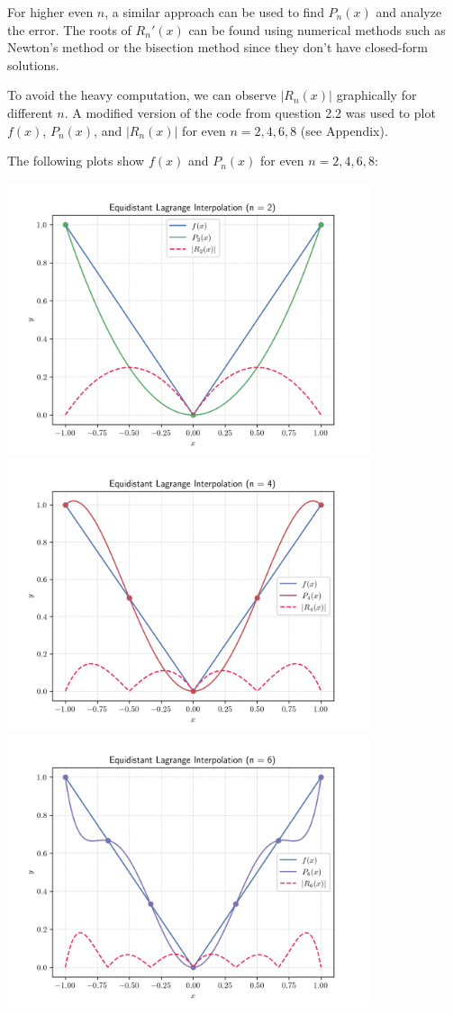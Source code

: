 \documentclass[12pt]{article}
\newcounter{question}
\begin{document}
For higher even $n$, a similar approach can be used to find $P_n(x)$ and analyze the error. The roots of $R_n'(x)$ can be found using numerical methods such as Newton's method or the bisection method since they don't have closed-form solutions.

To avoid the heavy computation, we can observe $|R_n(x)|$ graphically for different $n$. A modified version of the code from question 2.2 was used to plot $f(x)$, $P_n(x)$, and $|R_n(x)|$ for even $n=2, 4, 6, 8$ (see Appendix).

\newpage

The following plots show $f(x)$ and $P_n(x)$ for even $n=2, 4, 6, 8$:
\begin{center}
    \includegraphics[width=0.8\textwidth]{../plots_2/q4_3/p2.png}
    \includegraphics[width=0.8\textwidth]{../plots_2/q4_3/p4.png}
    \includegraphics[width=0.8\textwidth]{../plots_2/q4_3/p6.png}

\end{center}
\end{document}
